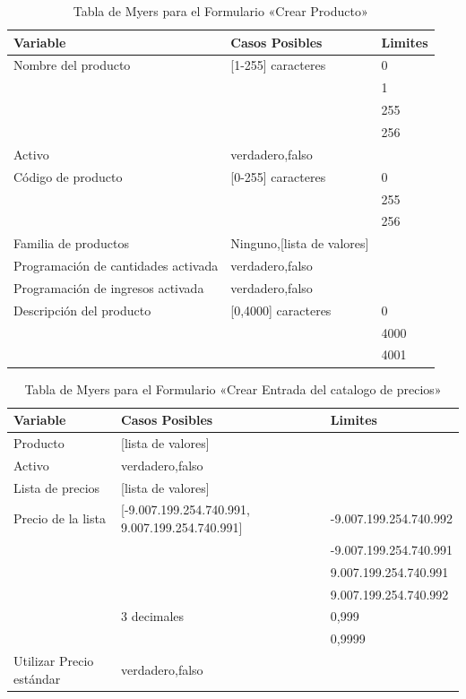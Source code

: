 \begin{table}
\centering
\begin{tabular}{|l|l|l|}
\hline
\textbf{Variable} & \textbf{Casos Posibles} & \textbf{Limites} \\
\hline
Nombre del producto & [1-255] caracteres & 0 \\
& & 1 \\
& & 255 \\
& & 256 \\
\hline
Activo  & {verdadero,falso} & \\
\hline
Código de producto & [0-255] caracteres & 0 \\
& & 255 \\
& & 256 \\
\hline
Familia de productos & Ninguno,[lista de valores] & \\
\hline
Programación de cantidades activada & {verdadero,falso} & \\
\hline
Programación de ingresos activada & {verdadero,falso} & \\
\hline
Descripción del producto & [0,4000] caracteres & 0 \\
& & 4000 \\
& & 4001 \\
\hline
\end{tabular}
\caption{Tabla de Myers para el Formulario «Crear Producto»}
\label{myers_01}
\end{table}

\begin{table}
\centering
\begin{tabular}{|l|p{5.0cm}|l|}
\hline
\textbf{Variable} & \textbf{Casos Posibles} & \textbf{Limites} \\
\hline
Producto & [lista de valores] & \\
\hline
Activo  & {verdadero,falso} & \\
\hline
Lista de precios & [lista de valores] & \\
\hline
Precio de la lista & [-9.007.199.254.740.991, 9.007.199.254.740.991] & -9.007.199.254.740.992 \\
& & -9.007.199.254.740.991 \\
& & 9.007.199.254.740.991 \\
& & 9.007.199.254.740.992 \\
& 3 decimales & 0,999 \\
& & 0,9999 \\
\hline
Utilizar Precio estándar & {verdadero,falso} & \\
\hline
\end{tabular}
\caption{Tabla de Myers para el Formulario «Crear Entrada del catalogo de precios»}
\label{myers_02}
\end{table}

